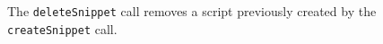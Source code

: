 The \verb+deleteSnippet+ call removes a script previously created by the \verb+createSnippet+ call.
